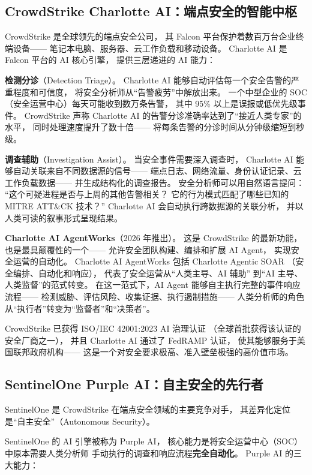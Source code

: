 \subsection{CrowdStrike Charlotte AI：端点安全的智能中枢}

CrowdStrike 是全球领先的端点安全公司，
其 Falcon 平台保护着数百万台企业终端设备——
笔记本电脑、服务器、云工作负载和移动设备。
Charlotte AI 是 Falcon 平台的 AI 核心引擎，
提供三层递进的 AI 能力：

\textbf{检测分诊}（Detection Triage）。
Charlotte AI 能够自动评估每一个安全告警的严重程度和可信度，
将安全分析师从``告警疲劳''中解放出来。
一个中型企业的 SOC（安全运营中心）每天可能收到数万条告警，
其中 95\% 以上是误报或低优先级事件。
CrowdStrike 声称 Charlotte AI 的告警分诊准确率达到了``接近人类专家''的水平，
同时处理速度提升了数十倍——
将每条告警的分诊时间从分钟级缩短到秒级。

\textbf{调查辅助}（Investigation Assist）。
当安全事件需要深入调查时，
Charlotte AI 能够自动关联来自不同数据源的信号——
端点日志、网络流量、身份认证记录、云工作负载数据——
并生成结构化的调查报告。
安全分析师可以用自然语言提问：
``这个可疑进程是否与上周的其他告警相关？
它的行为模式匹配了哪些已知的 MITRE ATT\&CK 技术？''
Charlotte AI 会自动执行跨数据源的关联分析，
并以人类可读的叙事形式呈现结果。

\textbf{Charlotte AI AgentWorks}（2026 年推出）。
这是 CrowdStrike 的最新功能，也是最具颠覆性的一个——
允许安全团队构建、编排和扩展 AI Agent，
实现安全运营的自动化。
Charlotte AI AgentWorks 包括 Charlotte Agentic SOAR
（安全编排、自动化和响应），
代表了安全运营从``人类主导、AI 辅助''
到``AI 主导、人类监督''的范式转变。
在这一范式下，AI Agent 能够自主执行完整的事件响应流程——
检测威胁、评估风险、收集证据、执行遏制措施——
人类分析师的角色从``执行者''转变为``监督者''和``决策者''。

CrowdStrike 已获得 ISO/IEC 42001:2023 AI 治理认证
（全球首批获得该认证的安全厂商之一），
并且 Charlotte AI 通过了 FedRAMP 认证，
使其能够服务于美国联邦政府机构——
这是一个对安全要求极高、准入壁垒极强的高价值市场。

\subsection{SentinelOne Purple AI：自主安全的先行者}

SentinelOne 是 CrowdStrike 在端点安全领域的主要竞争对手，
其差异化定位是``自主安全''（Autonomous Security）。

SentinelOne 的 AI 引擎被称为 Purple AI，
核心能力是将安全运营中心（SOC）中原本需要人类分析师
手动执行的调查和响应流程\textbf{完全自动化}。
Purple AI 的三大能力：

